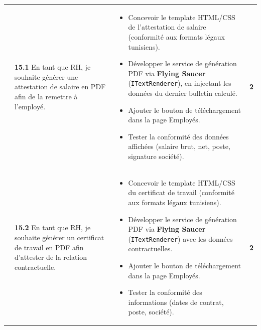 \begin{small}
\begin{longtable}{|p{2.8cm}|p{6.2cm}|p{6.2cm}|c|}
& \textbf{15.1} En tant que RH, je souhaite générer une attestation de salaire en PDF afin de la remettre à l'employé.
& \begin{itemize}[leftmargin=*, noitemsep, topsep=0pt]
    \item Concevoir le template HTML/CSS de l'attestation de salaire (conformité aux formats légaux tunisiens).
    \item Développer le service de génération PDF via \textbf{Flying Saucer}~\cite{flyingsaucer} (\texttt{ITextRenderer}), en injectant les données du dernier bulletin calculé.
    \item Ajouter le bouton de téléchargement dans la page Employés.
    \item Tester la conformité des données affichées (salaire brut, net, poste, signature société).
  \end{itemize}
& \textbf{2} \\ 

& \textbf{15.2} En tant que RH, je souhaite générer un certificat de travail en PDF afin d'attester de la relation contractuelle.
& \begin{itemize}[leftmargin=*, noitemsep, topsep=0pt]
    \item Concevoir le template HTML/CSS du certificat de travail (conformité aux formats légaux tunisiens).
    \item Développer le service de génération PDF via \textbf{Flying Saucer}~\cite{flyingsaucer} (\texttt{ITextRenderer}) avec les données contractuelles.
    \item Ajouter le bouton de téléchargement dans la page Employés.
    \item Tester la conformité des informations (dates de contrat, poste, société).
  \end{itemize}
& \textbf{2} \\ \hline


\end{longtable}
\end{small}
